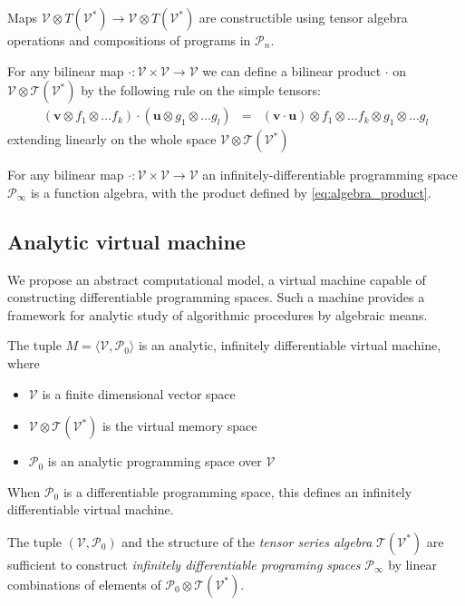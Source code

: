 \documentclass[smallcondensed]{svjour3}
\newcommand{\T}{\mathcal{T}}
\newcommand{\VV}{\mathcal{V}}
\newcommand{\uu}{\mathbf{u}}
\newcommand{\vv}{\mathbf{v}}
\newcommand{\dP}{\mathcal{P}}
\begin{document}
       \begin{remark}\label{rem:vTen}
       Maps $\VV\otimes T(\VV^*)\to \VV\otimes T(\VV^*)$ are constructible using
       tensor algebra operations and compositions of programs in $\dP_n$.
       \end{remark}
       
 

\begin{definition}
 For any bilinear map $\cdot :\VV\times \VV\to \VV$ we can define a
 bilinear product $\cdot$ on $\VV\otimes \T(\VV^*)$ by the following rule on the
 simple tensors:
 \begin{eqnarray}
   \label{eq:algebra_product}
   (\vv\otimes f_1\otimes\ldots f_k) \cdot (\uu\otimes g_1\otimes\ldots g_l) &=& 
(\vv\cdot \uu)\otimes f_1\otimes\ldots f_k\otimes g_1\otimes\ldots g_l 
 \end{eqnarray}
extending linearly on the whole space $\VV\otimes\T(\VV^*)$
\end{definition}
\begin{theorem}\label{izr:alg}
 For any bilinear map $\cdot :\VV\times \VV\to \VV$ an infinitely-differentiable
 programming space $\dP_\infty$ is a function algebra, with the product defined
 by \eqref{eq:algebra_product}.
\end{theorem}

\subsection{Analytic virtual machine}

We propose an abstract computational model, a virtual machine capable of
constructing differentiable programming spaces. Such a machine provides a
framework for analytic study of algorithmic procedures by algebraic means. 



\begin{definition}\label{def:analyticMachine}
The tuple $M=\langle \VV,\dP_0\rangle$ is an analytic, infinitely  differentiable virtual machine, where
   
    \begin{itemize}
    \item
    $\VV$ is a finite dimensional vector space
    \item
    $\VV\otimes \T(\VV^*)$ is the virtual memory space
    \item
    $\dP_0$ is an analytic programming space over $\VV$
    \end{itemize}
    When $\dP_0$ is a differentiable programming space, this defines an
    infinitely differentiable virtual machine.
  \end{definition}
\begin{remark}
The tuple  $(\VV,\dP_0)$ and the structure of the \emph{tensor series algebra}
$\T(\VV^*)$ are sufficient to construct \emph{infinitely differentiable
  programing spaces} $\dP_\infty$ by linear combinations of elements of
$\dP_0\otimes \T(\VV^*)$. 
\end{remark}
\end{document}
